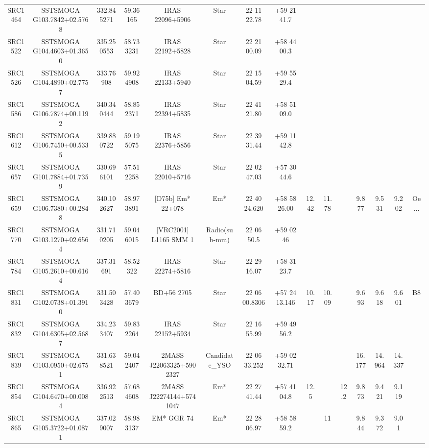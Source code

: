 \begin{table}
\begin{tabular}{ccccccccccccccc}
SRC1464 & SSTSMOGA G103.7842+02.5768 & 332.845271 & 59.36165 & IRAS 22096+5906 & Star & 22 11 22.78 & +59 21 41.7 &  &  &  &  &  &  &  \\
SRC1522 & SSTSMOGA G104.4603+01.3650 & 335.250553 & 58.733231 & IRAS 22192+5828 & Star & 22 21 00.09 & +58 44 00.3 &  &  &  &  &  &  &  \\
SRC1526 & SSTSMOGA G104.4890+02.7757 & 333.76908 & 59.924908 & IRAS 22133+5940 & Star & 22 15 04.59 & +59 55 29.4 &  &  &  &  &  &  &  \\
SRC1586 & SSTSMOGA G106.7874+00.1192 & 340.340444 & 58.852371 & IRAS 22394+5835 & Star & 22 41 21.80 & +58 51 09.0 &  &  &  &  &  &  &  \\
SRC1612 & SSTSMOGA G106.7450+00.5335 & 339.880722 & 59.195075 & IRAS 22376+5856 & Star & 22 39 31.44 & +59 11 42.8 &  &  &  &  &  &  &  \\
SRC1657 & SSTSMOGA G101.7884+01.7359 & 330.696101 & 57.512258 & IRAS 22010+5716 & Star & 22 02 47.03 & +57 30 44.6 &  &  &  &  &  &  &  \\
SRC1659 & SSTSMOGA G106.7380+00.2848 & 340.102627 & 58.973891 & [D75b] Em* 22+078 & Em* & 22 40 24.620 & +58 58 26.00 & 12.42 & 11.78 &  & 9.877 & 9.531 & 9.202 & Oe... \\
SRC1770 & SSTSMOGA G103.1270+02.6564 & 331.710205 & 59.046015 & [VRC2001] L1165 SMM 1 & Radio(sub-mm) & 22 06 50.5 & +59 02 46 &  &  &  &  &  &  &  \\
SRC1784 & SSTSMOGA G105.2610+00.6164 & 337.31691 & 58.52322 & IRAS 22274+5816 & Star & 22 29 16.07 & +58 31 23.7 &  &  &  &  &  &  &  \\
SRC1831 & SSTSMOGA G102.0738+01.3910 & 331.503428 & 57.403679 & BD+56  2705 & Star & 22 06 00.8306 & +57 24 13.146 & 10.17 & 10.09 &  & 9.693 & 9.618 & 9.601 & B8 \\
SRC1832 & SSTSMOGA G104.6305+02.5687 & 334.233407 & 59.832264 & IRAS 22152+5934 & Star & 22 16 55.99 & +59 49 56.2 &  &  &  &  &  &  &  \\
SRC1839 & SSTSMOGA G103.0950+02.6751 & 331.638521 & 59.042407 & 2MASS J22063325+5902327 & Candidate_YSO & 22 06 33.252 & +59 02 32.71 &  &  &  & 16.177 & 14.964 & 14.337 &  \\
SRC1854 & SSTSMOGA G104.6470+00.0084 & 336.922513 & 57.684608 & 2MASS J22274144+5741047 & Em* & 22 27 41.44 & +57 41 04.8 & 12.5 &  & 12.2 & 9.873 & 9.421 & 9.119 &  \\
SRC1865 & SSTSMOGA G105.3722+01.0871 & 337.029007 & 58.983137 & EM* GGR   74 & Em* & 22 28 06.97 & +58 58 59.2 &  & 11 &  & 9.844 & 9.372 & 9.01 &  \\

\end{tabular}
\end{table}
